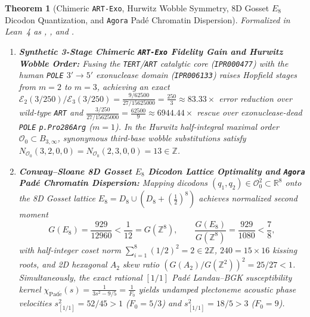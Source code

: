 \documentclass[11pt,a4paper]{article}
\newtheorem{theorem}{Theorem}[section]
\theoremstyle{definition}
\begin{document}
\begin{theorem}[Chimeric \texttt{ART-Exo}, Hurwitz Wobble Symmetry, 8D Gosset $E_8$ Dicodon Quantization, and \texttt{Agora} Pad\'e Chromatin Dispersion]
\label{thm:chimeric_art_exo_e8}
Formalized in Lean~4 as , , and .
\begin{enumerate}
  \item \textbf{Synthetic 3-Stage Chimeric \texttt{ART-Exo} Fidelity Gain and Hurwitz Wobble Order:} Fusing the \texttt{TERT}/\texttt{ART} catalytic core (\texttt{IPR000477}) with the human \texttt{POLE} $3'\to 5'$ exonuclease domain (\texttt{IPR006133}) raises Hopfield stages from $m=2$ to $m=3$, achieving an exact $\mathcal{E}_2(3/250)/\mathcal{E}_3(3/250) = \frac{9/62500}{27/15625000} = \frac{250}{3} \approx 83.33\times$ error reduction over wild-type \texttt{ART} and $\frac{3/250}{27/15625000} = \frac{62500}{9} \approx 6944.44\times$ rescue over exonuclease-dead \texttt{POLE} \texttt{p.Pro286Arg} ($m=1$). In the Hurwitz half-integral maximal order $\mathcal{O}_0 \subset B_{3,\infty}$, synonymous third-base wobble substitutions satisfy $N_{\mathcal{O}_0}(3,2,0,0) = N_{\mathcal{O}_0}(2,3,0,0) = 13 \in \mathbb{Z}$.
  \item \textbf{Conway--Sloane 8D Gosset $E_8$ Dicodon Lattice Optimality and \texttt{Agora} Pad\'e Chromatin Dispersion:} Mapping dicodons $(q_1, q_2) \in \mathcal{O}_0^2 \subset \mathbb{R}^8$ onto the 8D Gosset lattice $E_8 = D_8 \cup (D_8 + (\frac{1}{2})^8)$ achieves normalized second moment
  \begin{equation}
    G(E_8) = \frac{929}{12960} < \frac{1}{12} = G(\mathbb{Z}^8), \qquad \frac{G(E_8)}{G(\mathbb{Z}^8)} = \frac{929}{1080} < \frac{7}{8},
  \end{equation}
  with half-integer coset norm $\sum_{i=1}^8 (1/2)^2 = 2 \in 2\mathbb{Z}$, $240 = 15\times 16$ kissing roots, and 2D hexagonal $A_2$ skew ratio $(G(A_2)/G(\mathbb{Z}^2))^2 = 25/27 < 1$. Simultaneously, the exact rational $[1/1]$ Pad\'e Landau--BGK susceptibility kernel $\chi_{\mathrm{Pad\acute{e}}}(s) = \frac{1}{3s^2 - 9/5} = \frac{1}{F_0}$ yields undamped plectoneme acoustic phase velocities $s_{[1/1]}^2 = 52/45 > 1$ ($F_0 = 5/3$) and $s_{[1/1]}^2 = 18/5 > 3$ ($F_0 = 9$).
\end{enumerate}
\end{theorem}
\end{document}
